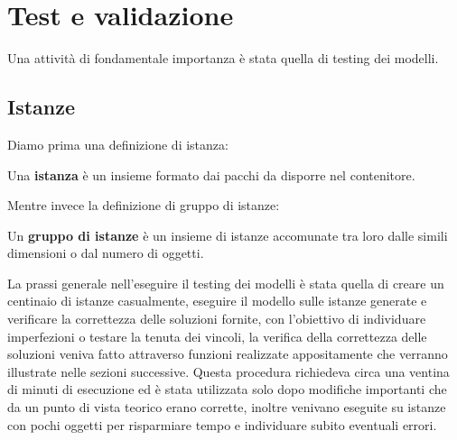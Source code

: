 
\hypertarget{(chap:capitolo5)}{}
\chapter{Test e validazione}
Una attività di fondamentale importanza è stata quella di testing dei modelli.
\section{Istanze}
Diamo prima una definizione di istanza:
\begin{center}
	Una \textbf{istanza} è un insieme formato dai pacchi da disporre nel contenitore.
\end{center}
Mentre invece la definizione di gruppo di istanze:
\begin{center}
	Un \textbf{gruppo di istanze} è un insieme di istanze accomunate tra loro dalle simili dimensioni o dal numero di oggetti.
\end{center}
La prassi generale nell'eseguire il testing dei modelli è stata quella di creare un centinaio di istanze casualmente, eseguire il modello sulle istanze generate e verificare la correttezza delle soluzioni fornite, con l'obiettivo di individuare imperfezioni o testare la tenuta dei vincoli, la verifica della correttezza delle soluzioni veniva fatto attraverso funzioni realizzate appositamente che verranno illustrate nelle sezioni successive.
Questa procedura richiedeva circa una ventina di minuti di esecuzione ed è stata utilizzata solo dopo modifiche importanti che da un punto di vista teorico erano corrette, inoltre venivano eseguite su istanze con pochi oggetti per risparmiare tempo e individuare subito eventuali errori.

